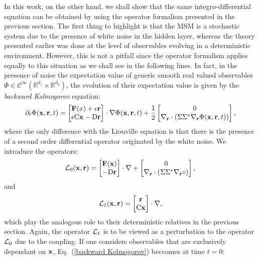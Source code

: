 \documentclass[12pt]{article}
\begin{document}
In this work, on the other hand, we shall show that the same integro-differential equation can be obtained by using the operator formalism presented in the previous section. The first thing to highlight is that the MSM is a stochastic system due to the presence of  white noise in the hidden layer, whereas the theory presented earlier was done at the level of observables evolving in a deterministic environment. However, this is not a pitfall since the operator formalism applies equally to this situation as we shall see in the following lines. In fact, in the presence of noise the expectation value of generic smooth real valued observables $\Phi \in \mathcal{C}^{\infty}(\mathbb{R}^{d_1}\times \mathbb{R}^{d_2})$, the evolution of their expectation value is given by the \emph{backward Kolmogorov} equation:
\begin{equation}\label{backward Kolmogorov}
\partial _t \Phi (\mathbf{x},\mathbf{r},t)=\begin{bmatrix}\mathbf{F}(x)+\epsilon \mathbf{r}\\ \epsilon \mathrm{C}\mathbf{x} - \mathrm{D}\mathbf{r} \end{bmatrix}\cdot \nabla \Phi(\mathbf{x},\mathbf{r},t) + \frac{1}{2}\begin{bmatrix} 0 \\ \nabla_{\mathbf{r}} \cdot \left( \Sigma\Sigma^{\ast}\nabla_{\mathbf{r}}\Phi(\mathbf{x},\mathbf{r},t) \right) \end{bmatrix},
\end{equation}
where the only difference with the Liouville equation is that there is the presence of a second order differential operator originated by the white noise. We introduce the operators:
\begin{equation}
\mathcal{L}_0(\mathbf{x},\mathbf{r})=\begin{bmatrix} \mathbf{F}(\mathbf{x})\\ - \mathrm{D}\mathbf{r} \end{bmatrix}\cdot \nabla +\begin{bmatrix} 0 \\ \nabla_{\mathbf{r}} \cdot \left( \Sigma\Sigma^{\ast}\nabla_{\mathbf{r}} \circ\right) \end{bmatrix},
\end{equation}
and
\begin{equation}
\mathcal{L}_1(\mathbf{x},\mathbf{r})=\begin{bmatrix} \mathbf{r}\\ \mathrm{C}\mathbf{x} \end{bmatrix}\cdot \nabla,
\end{equation}
which play the analogous role to their deterministic relatives in the previous section. Again, the operator $\mathcal{L}_1$ is to be viewed as a perturbation to the operator $\mathcal{L}_0$ due to the coupling. If one considers observables that are exclusively dependant on $\mathbf{x}$, Eq.~(\ref{backward Kolmogorov}) beccomes at time $t=0$:
\end{document}
